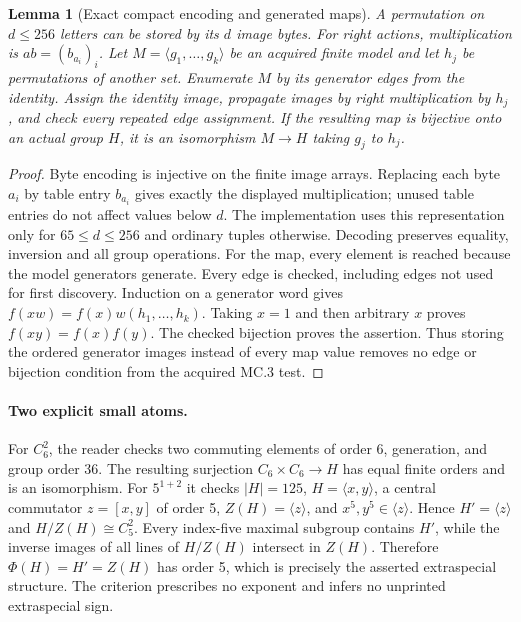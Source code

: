 \documentclass[11pt]{article}
\newtheorem{lemma}[theorem]{Lemma}
\begin{document}
\newpage
\begin{lemma}[Exact compact encoding and generated maps]
A permutation on $d\leq256$ letters can be stored by its $d$ image bytes.
For right actions, multiplication is $a b=(b_{a_i})_i$.
Let $M=\langle g_1,\ldots,g_k\rangle$ be an acquired finite model and let
$h_j$ be permutations of another set. Enumerate $M$ by its generator
edges from the identity. Assign the identity image, propagate images by
right multiplication by $h_j$, and check every repeated edge assignment.
If the resulting map is bijective onto an actual group $H$, it is an
isomorphism $M\longrightarrow H$ taking $g_j$ to $h_j$.
\end{lemma}
\begin{proof}
Byte encoding is injective on the finite image arrays. Replacing each byte
$a_i$ by table entry $b_{a_i}$ gives exactly the displayed multiplication;
unused table entries do not affect values below $d$. The implementation
uses this representation only for $65\leq d\leq256$ and ordinary tuples
otherwise. Decoding preserves equality, inversion and all group operations.
For the map, every element is reached because the model generators generate.
Every edge is checked, including edges not used for first discovery. Induction
on a generator word gives $f(xw)=f(x)w(h_1,\ldots,h_k)$. Taking $x=1$
and then arbitrary $x$ proves $f(xy)=f(x)f(y)$. The checked bijection proves
the assertion. Thus storing the ordered generator images instead of every
map value removes no edge or bijection condition from the acquired MC.3 test.
\end{proof}

\paragraph{Two explicit small atoms.}
For $C_6^2$, the reader checks two commuting elements of order 6, generation,
and group order 36. The resulting surjection $C_6\times C_6\to H$ has
equal finite orders and is an isomorphism. For $5^{1+2}$ it checks
$|H|=125$, $H=\langle x,y\rangle$, a central commutator $z=[x,y]$ of
order 5, $Z(H)=\langle z\rangle$, and $x^5,y^5\in\langle z\rangle$.
Hence $H'=\langle z\rangle$ and $H/Z(H)\cong C_5^2$. Every index-five
maximal subgroup contains $H'$, while the inverse images of all lines of
$H/Z(H)$ intersect in $Z(H)$. Therefore $\Phi(H)=H'=Z(H)$ has order 5,
which is precisely the asserted extraspecial structure. The criterion prescribes no exponent and infers no unprinted extraspecial sign.
\end{document}
